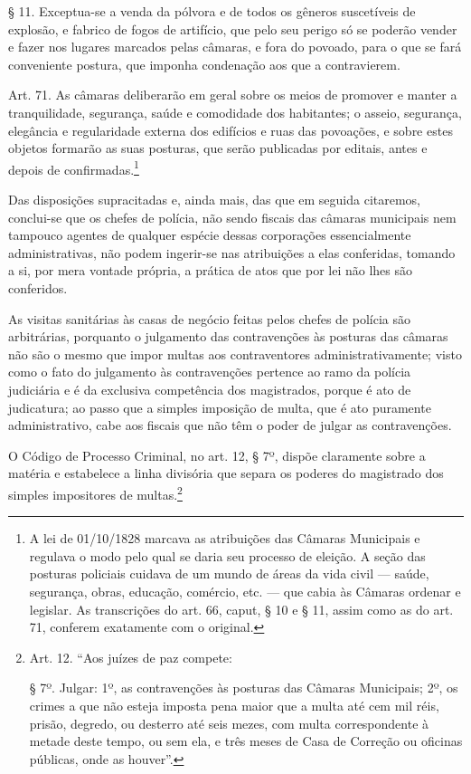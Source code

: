 § 11. Exceptua-se a venda da pólvora e de todos os gêneros suscetíveis
de explosão, e fabrico de fogos de artifício, que pelo seu perigo só se
poderão vender e fazer nos lugares marcados pelas câmaras, e fora do
povoado, para o que se fará conveniente postura, que imponha condenação
aos que a contravierem.

Art. 71. As câmaras deliberarão em geral sobre os meios de promover e
manter a tranquilidade, segurança, saúde e comodidade dos habitantes; o
asseio, segurança, elegância e regularidade externa dos edifícios e ruas
das povoações, e sobre estes objetos formarão as suas posturas, que
serão publicadas por editais, antes e depois de confirmadas.\footnote{
  A lei de 01/10/1828 marcava as atribuições das Câmaras Municipais e
  regulava o modo pelo qual se daria seu processo de eleição. A seção
  das posturas policiais cuidava de um mundo de áreas da vida civil ---
  saúde, segurança, obras, educação, comércio, etc. --- que cabia às
  Câmaras ordenar e legislar. As transcrições do art. 66, caput, § 10 e
  § 11, assim como as do art. 71, conferem exatamente com o original.}

Das disposições supracitadas e, ainda mais, das que em seguida
citaremos, conclui-se que os chefes de polícia, não sendo fiscais das
câmaras municipais nem tampouco agentes de qualquer espécie dessas
corporações essencialmente administrativas, não podem ingerir-se nas
atribuições a elas conferidas, tomando a si, por mera vontade própria, a
prática de atos que por lei não lhes são conferidos.

As visitas sanitárias às casas de negócio feitas pelos chefes de polícia
são arbitrárias, porquanto o julgamento das contravenções às posturas
das câmaras não são o mesmo que impor multas aos contraventores
administrativamente; visto como o fato do julgamento às contravenções
pertence ao ramo da polícia judiciária e é da exclusiva competência dos
magistrados, porque é ato de judicatura; ao passo que a simples
imposição de multa, que é ato puramente administrativo, cabe aos fiscais
que não têm o poder de julgar as contravenções.

O Código de Processo Criminal, no art. 12, § 7º, dispõe claramente sobre
a matéria e estabelece a linha divisória que separa os poderes do
magistrado dos simples impositores de multas.\footnote{Art. 12. ``Aos
  juízes de paz compete:

  § 7º. Julgar: 1º, as contravenções às posturas das Câmaras Municipais;
  2º, os crimes a que não esteja imposta pena maior que a multa até cem
  mil réis, prisão, degredo, ou desterro até seis mezes, com multa
  correspondente à metade deste tempo, ou sem ela, e três meses de Casa
  de Correção ou oficinas públicas, onde as houver''.}

